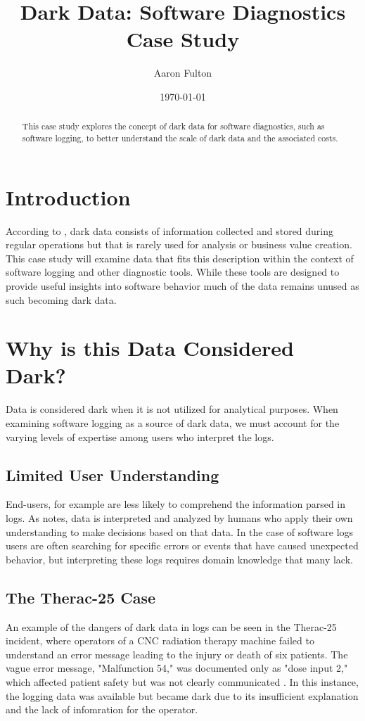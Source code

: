 \documentclass{article}
\title{Dark Data: Software Diagnostics Case Study}
\author{Aaron Fulton}
\date{\today}
\begin{document}
\maketitle

\begin{abstract}
This case study explores the concept of dark data for software diagnostics, such as software logging, to better understand the scale of dark data 
and the associated costs.
\end{abstract}

\section{Introduction}
According to \parencite{gartner2023darkdata}, dark data consists of information collected and stored during regular operations but that is rarely used for analysis 
or business value creation. This case study will examine data that fits this description within the context of software logging and other diagnostic tools. While 
these tools are designed to provide useful insights into software behavior much of the data remains unused as such becoming dark data.

\section{Why is this Data Considered Dark?}

Data is considered dark when it is not utilized for analytical purposes. When examining software logging as a source of dark data, we must account for the varying 
levels of expertise among users who interpret the logs. 

\subsection{Limited User Understanding}
End-users, for example are less likely to comprehend the information parsed in logs. As \parencite{David2020dartdata} notes, data is interpreted and analyzed by
 humans who apply their own understanding to make decisions based on that data. In the case of software logs users are often searching for specific errors or events 
 that have caused unexpected behavior, but interpreting these logs requires domain knowledge that many lack.

\subsection{The Therac-25 Case}
An example of the dangers of dark data in logs can be seen in the Therac-25 incident, where operators of a CNC radiation therapy machine failed to understand an 
error message leading to the injury or death of six patients. The vague error message, "Malfunction 54," was documented only as "dose input 2," which 
affected patient safety but was not clearly communicated \parencite{Leveson1993Therac25}. In this instance, the logging data was available but became dark due to 
its insufficient explanation and the lack of infomration for the operator.
\end{document}
